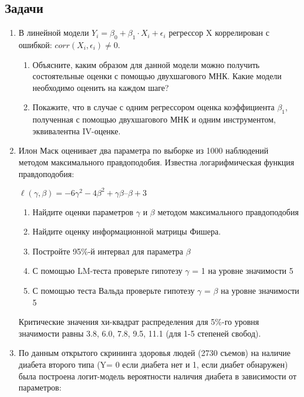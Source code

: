 \documentclass[12pt]{article}
\def \putyourname{\fbox{
    \begin{minipage}{42em}
      Фамилия, имя, номер группы:\vspace*{3ex}\par
      \noindent\dotfill\vspace{2mm}
    \end{minipage}
  }
}
\theoremstyle{definition}
\begin{document}
\newpage
\putyourname

\subsection*{Задачи}

\begin{enumerate}
\item 
В линейной модели \( Y_i = \beta_0 + \beta_1 \cdot X_i + \epsilon_i \) регрессор X коррелирован с ошибкой: \( corr(X_i, \epsilon_i  ) \neq 0 \).

\begin{enumerate}
  \item Объясните, каким образом для данной модели можно получить состоятельные оценки с помощью двухшагового МНК. 
  Какие модели необходимо оценить на каждом шаге?
  \item Покажите, что в случае с одним регрессором оценка коэффициента $\beta_1$, 
  полученная с помощью двухшагового МНК и одним инструментом, эквивалентна IV-оценке.
\end{enumerate}

\item Илон Маск оценивает два параметра по выборке из 1000 наблюдений методом максимального правдоподобия. Известна логарифмическая функция правдоподобия:

\( \ell ( \gamma, \beta) = -6 \gamma^2-4 \beta^2+ \gamma \beta– \beta+3 \)

\begin{enumerate}
\item  Найдите оценки параметров \( \gamma \) и \( \beta \) методом максимального правдоподобия

\item Найдите оценку информационной матрицы Фишера.

\item  Постройте 95\%-й интервал для параметра \( \beta \) 

\item  С помощью LM-теста проверьте гипотезу \( \gamma \) = 1 на уровне значимости 5%

\item С помощью теста Вальда проверьте гипотезу \( \gamma \) = \( \beta \)  на уровне значимости 5%
\end{enumerate}

Критические значения хи-квадрат распределения для 5\%-го уровня значимости равны 3.8, 6.0, 7.8, 9.5, 11.1 (для 1-5 степеней свобод). 


\item По данным открытого скрининга здоровья людей (2730 съемов) на наличие диабета второго типа (Y= 0 если диабета нет и 1, если диабет обнаружен) была построена логит-модель вероятности наличия диабета в зависимости от параметров:


\end{enumerate}
\end{document}
